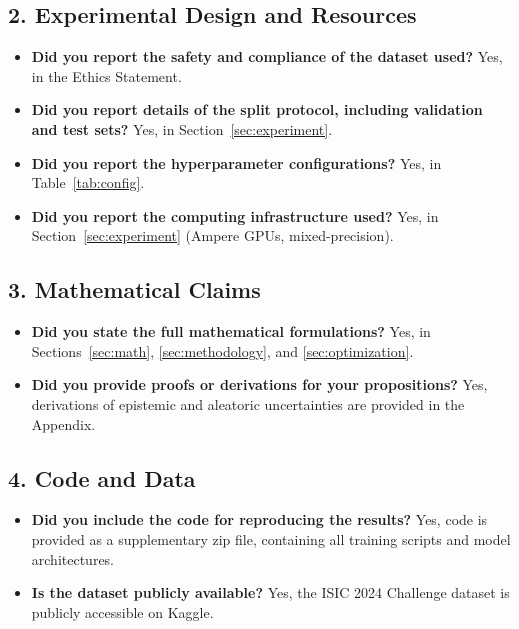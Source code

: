 \documentclass[letterpaper]{article} %
\begin{document}
\subsection*{2. Experimental Design and Resources}
\begin{itemize}
    \item \textbf{Did you report the safety and compliance of the dataset used?} Yes, in the Ethics Statement.
    \item \textbf{Did you report details of the split protocol, including validation and test sets?} Yes, in Section~\ref{sec:experiment}.
    \item \textbf{Did you report the hyperparameter configurations?} Yes, in Table~\ref{tab:config}.
    \item \textbf{Did you report the computing infrastructure used?} Yes, in Section~\ref{sec:experiment} (Ampere GPUs, mixed-precision).
\end{itemize}

\subsection*{3. Mathematical Claims}
\begin{itemize}
    \item \textbf{Did you state the full mathematical formulations?} Yes, in Sections~\ref{sec:math}, \ref{sec:methodology}, and \ref{sec:optimization}.
    \item \textbf{Did you provide proofs or derivations for your propositions?} Yes, derivations of epistemic and aleatoric uncertainties are provided in the Appendix.
\end{itemize}

\subsection*{4. Code and Data}
\begin{itemize}
    \item \textbf{Did you include the code for reproducing the results?} Yes, code is provided as a supplementary zip file, containing all training scripts and model architectures.
    \item \textbf{Is the dataset publicly available?} Yes, the ISIC 2024 Challenge dataset is publicly accessible on Kaggle.
\end{itemize}
\end{document}
